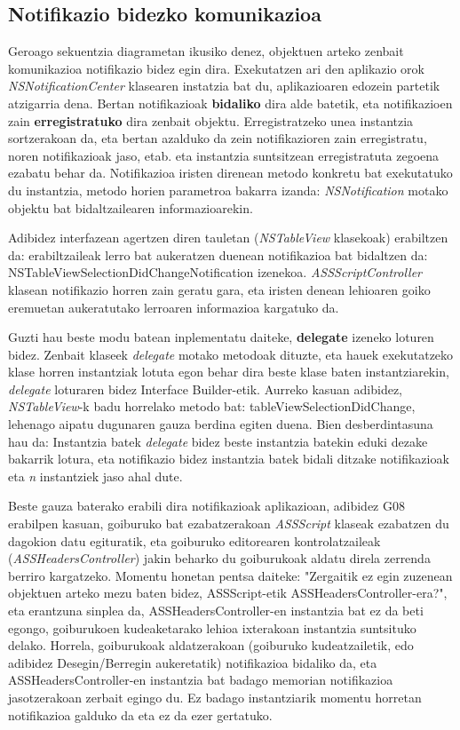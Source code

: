 \subsection{Notifikazio bidezko komunikazioa}
Geroago sekuentzia diagrametan ikusiko denez, objektuen arteko zenbait komunikazioa notifikazio bidez egin dira. Exekutatzen ari den aplikazio orok \textit{NSNotificationCenter} klasearen instatzia bat du, aplikazioaren edozein partetik atzigarria dena. Bertan notifikazioak \textbf{bidaliko} dira alde batetik, eta notifikazioen zain \textbf{erregistratuko} dira zenbait objektu. Erregistratzeko unea instantzia sortzerakoan da, eta bertan azalduko da zein notifikazioren zain erregistratu, noren notifikazioak jaso, etab. eta instantzia suntsitzean erregistratuta zegoena ezabatu behar da. Notifikazioa iristen direnean metodo konkretu bat exekutatuko du instantzia, metodo horien parametroa bakarra izanda: \textit{NSNotification} motako objektu bat bidaltzailearen informazioarekin.
 
Adibidez interfazean agertzen diren tauletan (\textit{NSTableView} klasekoak) erabiltzen da: erabiltzaileak lerro bat aukeratzen duenean notifikazioa bat bidaltzen da: NSTableViewSelectionDidChangeNotification izenekoa. \textit{ASSScriptController} klasean notifikazio horren zain geratu gara, eta iristen denean lehioaren goiko eremuetan aukeratutako lerroaren informazioa kargatuko da.

Guzti hau beste modu batean inplementatu daiteke, \textbf{delegate} izeneko loturen bidez. Zenbait klaseek \textit{delegate} motako metodoak dituzte, eta hauek exekutatzeko klase horren instantziak lotuta egon behar dira beste klase baten instantziarekin, \textit{delegate} loturaren bidez Interface Builder-etik. Aurreko kasuan adibidez, \textit{NSTableView}-k badu horrelako metodo bat: tableViewSelectionDidChange, lehenago aipatu dugunaren gauza berdina egiten duena. Bien desberdintasuna hau da: Instantzia batek \textit{delegate} bidez beste instantzia batekin eduki dezake bakarrik lotura, eta notifikazio bidez instantzia batek bidali ditzake notifikazioak eta \textit{n} instantziek jaso ahal dute.

Beste gauza baterako erabili dira notifikazioak aplikazioan, adibidez G08 erabilpen kasuan, goiburuko bat ezabatzerakoan \textit{ASSScript} klaseak ezabatzen du dagokion datu egituratik, eta goiburuko editorearen kontrolatzaileak (\textit{ASSHeadersController}) jakin beharko du goiburukoak aldatu direla zerrenda berriro kargatzeko. Momentu honetan pentsa daiteke: "Zergaitik ez egin zuzenean objektuen arteko mezu baten bidez, ASSScript-etik ASSHeadersController-era?", eta erantzuna sinplea da, ASSHeadersController-en instantzia bat ez da beti egongo, goiburukoen kudeaketarako lehioa ixterakoan instantzia suntsituko delako. Horrela, goiburukoak aldatzerakoan (goiburuko kudeatzailetik, edo adibidez Desegin/Berregin aukeretatik) notifikazioa bidaliko da, eta ASSHeadersController-en instantzia bat badago memorian notifikazioa jasotzerakoan zerbait egingo du. Ez badago instantziarik momentu horretan notifikazioa galduko da eta ez da ezer gertatuko.

